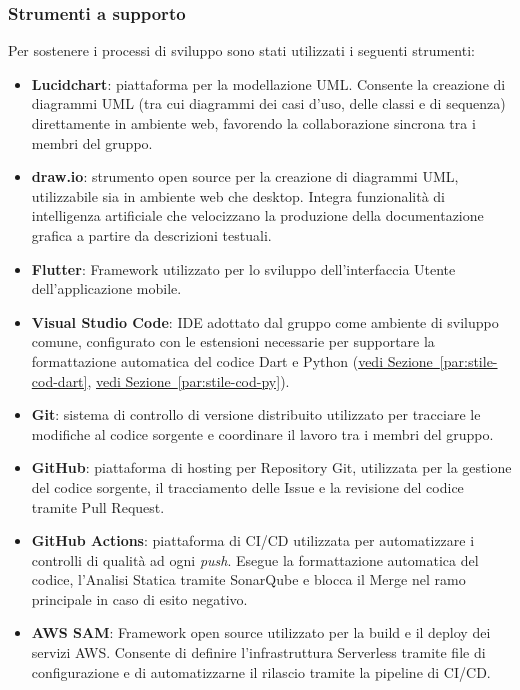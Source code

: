 \documentclass[a4paper,12pt]{article}
\begin{document}
\subsubsection{Strumenti a supporto}
Per sostenere i processi di sviluppo sono stati utilizzati i seguenti strumenti:
\begin{itemize}
    \item \textbf{Lucidchart}: piattaforma per la modellazione UML. Consente la creazione di diagrammi UML 
    (tra cui diagrammi dei casi d'uso, delle classi e di sequenza) direttamente in ambiente web, favorendo la collaborazione sincrona tra i membri del gruppo.
    \item \textbf{draw.io}: strumento open source per la creazione di diagrammi UML, utilizzabile sia in ambiente web che 
    desktop. Integra funzionalità di intelligenza artificiale che velocizzano la produzione della documentazione grafica a partire da descrizioni testuali.
    \item \textbf{Flutter}: Framework utilizzato per lo sviluppo dell'interfaccia Utente dell'applicazione mobile.
    \item \textbf{Visual Studio Code}: IDE adottato dal gruppo come ambiente di sviluppo comune, configurato 
    con le estensioni necessarie per supportare la formattazione automatica del codice Dart e 
    Python (\hyperref[par:stile-cod-dart]{vedi Sezione~\ref*{par:stile-cod-dart}}, \hyperref[par:stile-cod-py]{vedi Sezione~\ref*{par:stile-cod-py}}).
    \item \textbf{Git}: sistema di controllo di versione distribuito utilizzato per tracciare le modifiche al codice 
    sorgente e coordinare il lavoro tra i membri del gruppo.
    \item \textbf{GitHub}: piattaforma di hosting per Repository Git, utilizzata per la gestione del codice sorgente, 
    il tracciamento delle Issue e la revisione del codice tramite Pull Request.
    \item \textbf{GitHub Actions}: piattaforma di CI/CD utilizzata per 
    automatizzare i controlli di qualità ad ogni \textit{push}. Esegue la formattazione automatica del codice, 
    l'Analisi Statica tramite SonarQube e blocca il Merge nel ramo principale in caso di esito negativo.
    \item \textbf{AWS SAM}: Framework open source utilizzato per la build e il deploy dei servizi AWS. Consente 
    di definire l'infrastruttura Serverless tramite file di configurazione e di automatizzarne il rilascio tramite la pipeline di CI/CD.
\end{itemize}
\end{document}
